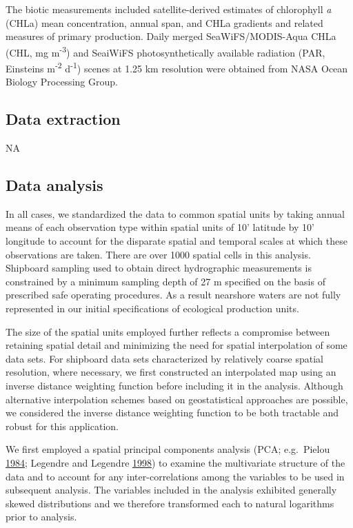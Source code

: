 \documentclass[
]{book}
\begin{document}
The biotic measurements included satellite-derived estimates of chlorophyll \emph{a} (CHLa) mean concentration, annual span, and CHLa gradients and related measures of primary production. Daily merged SeaWiFS/MODIS-Aqua CHLa (CHL, mg m\textsuperscript{-3}) and SeaiWiFS photosynthetically available radiation (PAR, Einsteins m\textsuperscript{-2} d\textsuperscript{-1}) scenes at 1.25 km resolution were obtained from NASA Ocean Biology Processing Group.

\hypertarget{data-extraction-13}{%
\subsection{Data extraction}\label{data-extraction-13}}

NA

\hypertarget{data-analysis-13}{%
\subsection{Data analysis}\label{data-analysis-13}}

In all cases, we standardized the data to common spatial units by taking annual means of each observation type within spatial units of 10' latitude by 10' longitude to account for the disparate spatial and temporal scales at which these observations are taken. There are over 1000 spatial cells in this analysis. Shipboard sampling used to obtain direct hydrographic measurements is constrained by a minimum sampling depth of 27 m specified on the basis of prescribed safe operating procedures. As a result nearshore waters are not fully represented in our initial specifications of ecological production units.

The size of the spatial units employed further reflects a compromise between retaining spatial detail and minimizing the need for spatial interpolation of some data sets. For shipboard data sets characterized by relatively coarse spatial resolution, where necessary, we first constructed an interpolated map using an inverse distance weighting function before including it in the analysis. Although alternative interpolation schemes based on geostatistical approaches are possible, we considered the inverse distance weighting function to be both tractable and robust for this application.

We first employed a spatial principal components analysis (PCA; e.g.~Pielou \protect\hyperlink{ref-Pielou1984}{1984}; Legendre and Legendre \protect\hyperlink{ref-Legendre1998}{1998}) to examine the multivariate structure of the data and to account for any inter-correlations among the variables to be used in subsequent analysis. The variables included in the analysis exhibited generally skewed distributions and we therefore transformed each to natural logarithms prior to analysis.
\end{document}
